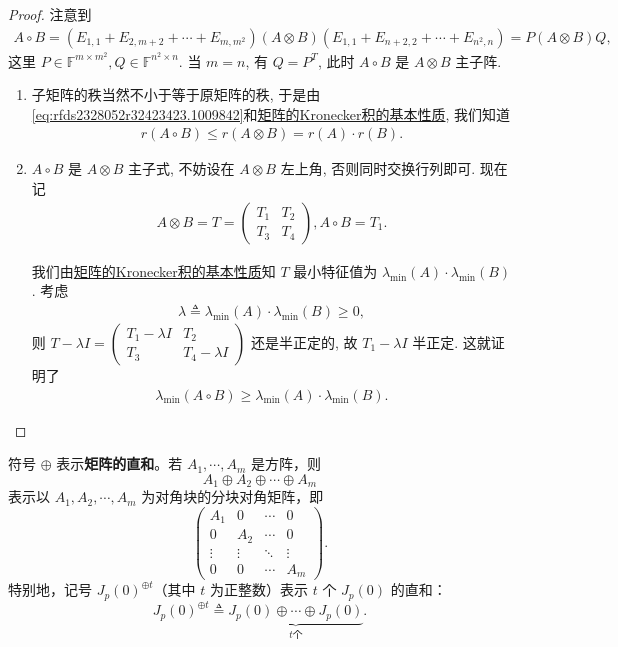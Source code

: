 \documentclass[../../main.tex]{subfiles}%
\begin{document}
\begin{proof}
注意到
\begin{align}\label{eq:rfds2328052r32423423.1009842}
A\circ B=(E_{1,1}+E_{2,m+2}+\cdots+E_{m,m^2})(A\otimes B)(E_{1,1}+E_{n+2,2}+\cdots+E_{n^2,n})=P(A\otimes B)Q,
\end{align}
这里 $P\in\mathbb{F}^{m\times m^2}, Q\in\mathbb{F}^{n^2\times n}$. 当 $m=n$, 有 $Q=P^T$, 此时 $A\circ B$ 是 $A\otimes B$ 主子阵. 
\begin{enumerate}
\item 子矩阵的秩当然不小于等于原矩阵的秩, 于是由\eqref{eq:rfds2328052r32423423.1009842}和\hyperref[theorem:矩阵的Kronecker积的基本性质]{矩阵的Kronecker积的基本性质}, 我们知道
\begin{align*}
r(A\circ B)\leqslant r(A\otimes B)=r(A)\cdot r(B).
\end{align*}

\item $A\circ B$ 是 $A\otimes B$ 主子式, 不妨设在 $A\otimes B$ 左上角, 否则同时交换行列即可. 现在记
\begin{align*}
A\otimes B=T=\begin{pmatrix}T_1&T_2\\T_3&T_4\end{pmatrix}, A\circ B=T_1.
\end{align*}

我们由\hyperref[theorem:矩阵的Kronecker积的基本性质]{矩阵的Kronecker积的基本性质}知 $T$ 最小特征值为 $\lambda_{\min}(A)\cdot\lambda_{\min}(B)$. 考虑
\begin{align*}
\lambda\triangleq\lambda_{\min}(A)\cdot\lambda_{\min}(B)\geqslant 0,
\end{align*}
则 $T-\lambda I=\begin{pmatrix}T_1-\lambda I&T_2\\T_3&T_4-\lambda I\end{pmatrix}$ 还是半正定的, 故 $T_1-\lambda I$ 半正定. 这就证明了
\begin{align*}
\lambda_{\min}(A\circ B)\geqslant \lambda_{\min}(A)\cdot\lambda_{\min}(B).
\end{align*}
\end{enumerate}
\end{proof}

\begin{definition}
符号 $\oplus$ 表示\textbf{矩阵的直和}。若 $A_1,\cdots,A_m$ 是方阵，则
\[
A_1\oplus A_2\oplus\cdots\oplus A_m
\]
表示以 $A_1,A_2,\cdots,A_m$ 为对角块的分块对角矩阵，即
\[
\begin{pmatrix}
A_1&0&\cdots&0\\
0&A_2&\cdots&0\\
\vdots&\vdots&\ddots&\vdots\\
0&0&\cdots&A_m
\end{pmatrix}.
\]
特别地，记号 $J_p(0)^{\oplus t}$（其中 $t$ 为正整数）表示 $t$ 个 $J_p(0)$ 的直和：
\[
J_p(0)^{\oplus t}\triangleq \underbrace{J_p(0)\oplus\cdots\oplus J_p(0)}_{t\text{个}}.
\]
\end{definition}
\end{document}
